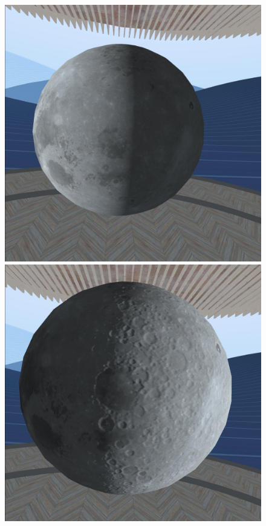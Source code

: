 \begin{figure}[htbp]
  \begin{minipage}[t]{\linewidth}
    \centering
    \includegraphics[keepaspectratio, width=0.49\linewidth]{figures/no-bump-map.jpg}
  \end{minipage}
  \begin{minipage}[t]{0.49\linewidth}
    \captionsetup[sub]{margin=0.1cm}
    \centering
    \includegraphics[keepaspectratio, width=\linewidth]{figures/bump-map0.jpg}
  \end{minipage}
  \begin{minipage}[t]{0.49\linewidth}
    \captionsetup[sub]{margin=0.1cm}
    \centering

\end{minipage}
\end{figure}
